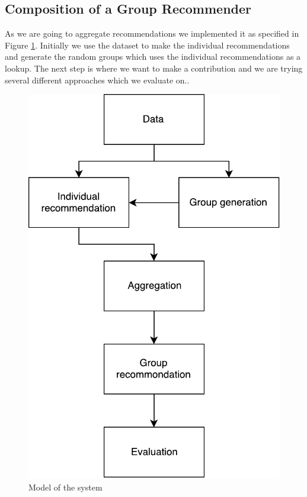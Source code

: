 \subsection{Composition of a Group Recommender}
As we are going to aggregate recommendations we implemented it as specified in Figure \ref{fig:composition}. Initially we use the dataset to make the individual recommendations and generate the random groups which uses the individual recommendations as a lookup. The next step is where we want to make a contribution and we are trying several different approaches which we evaluate on..
\begin{figure}
\centering
\includegraphics[scale=.4]{graphics/composition}
\caption{Model of the system}\label{fig:composition}
\end{figure}

